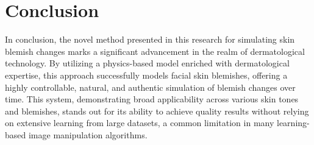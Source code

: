 
\chapter{Conclusion}
\begin{spacing}{1.5}
\setlength{\parskip}{0.3in}




In conclusion, the novel method presented in this research for simulating skin blemish changes marks a significant advancement in the realm of dermatological technology. By utilizing a physics-based model enriched with dermatological expertise, this approach successfully models facial skin blemishes, offering a highly controllable, natural, and authentic simulation of blemish changes over time. This system, demonstrating broad applicability across various skin tones and blemishes, stands out for its ability to achieve quality results without relying on extensive learning from large datasets, a common limitation in many learning-based image manipulation algorithms.


\end{spacing}
